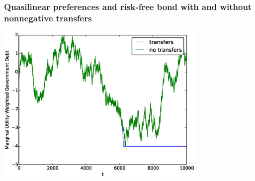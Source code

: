 \documentclass{beamer}
\begin{document}
 \begin{frame}
	\frametitle{Quasilinear preferences and risk-free bond  with and without nonnegative transfers}
	\begin{center}
	\includegraphics[width=4in]{Images/transfer_example2.eps}
	\end{center}
\end{frame}
\end{document}
